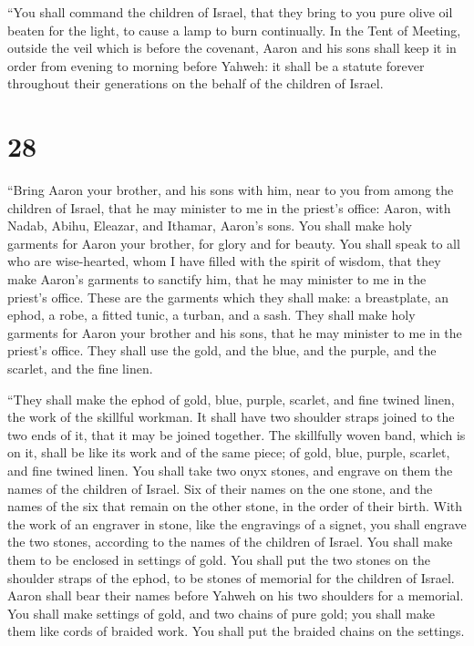  ``You shall command the children of Israel, that they
bring to you pure olive oil beaten for the light, to cause a lamp to
burn continually.  In the Tent of Meeting, outside the
veil which is before the covenant, Aaron and his sons shall keep it in
order from evening to morning before Yahweh: it shall be a statute
forever throughout their generations on the behalf of the children of
Israel.

\hypertarget{section-27}{%
\section{28}\label{section-27}}

 ``Bring Aaron your brother, and his sons with him, near
to you from among the children of Israel, that he may minister to me in
the priest's office: Aaron, with Nadab, Abihu, Eleazar, and Ithamar,
Aaron's sons.  You shall make holy garments for Aaron your
brother, for glory and for beauty.  You shall speak to all
who are wise-hearted, whom I have filled with the spirit of wisdom, that
they make Aaron's garments to sanctify him, that he may minister to me
in the priest's office.  These are the garments which they
shall make: a breastplate, an ephod, a robe, a fitted tunic, a turban,
and a sash. They shall make holy garments for Aaron your brother and his
sons, that he may minister to me in the priest's office. 
They shall use the gold, and the blue, and the purple, and the scarlet,
and the fine linen.

 ``They shall make the ephod of gold, blue, purple,
scarlet, and fine twined linen, the work of the skillful workman.
 It shall have two shoulder straps joined to the two ends
of it, that it may be joined together.  The skillfully
woven band, which is on it, shall be like its work and of the same
piece; of gold, blue, purple, scarlet, and fine twined linen.
 You shall take two onyx stones, and engrave on them the
names of the children of Israel.  Six of their names on
the one stone, and the names of the six that remain on the other stone,
in the order of their birth.  With the work of an
engraver in stone, like the engravings of a signet, you shall engrave
the two stones, according to the names of the children of Israel. You
shall make them to be enclosed in settings of gold.  You
shall put the two stones on the shoulder straps of the ephod, to be
stones of memorial for the children of Israel. Aaron shall bear their
names before Yahweh on his two shoulders for a memorial. 
You shall make settings of gold,  and two chains of pure
gold; you shall make them like cords of braided work. You shall put the
braided chains on the settings.

